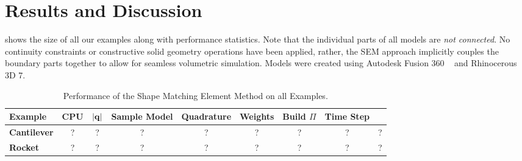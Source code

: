 %
\section{Results and Discussion}






 shows the size of all our examples along with performance statistics. 
Note that the individual parts of all models are \emph{not connected}.
No continuity constraints or constructive solid geometry operations have been applied, rather, the SEM approach implicitly couples the boundary parts together
to allow for seamless volumetric simulation. 
Models were created using Autodesk Fusion 360 ~ and Rhinocerous 3D 7.

\begin{table*}[h]
  \caption{Performance of the Shape Matching Element Method on all Examples.}
  \label{tbl:perf}
  \begin{center}
  \begin{tabular}{l c c c c c c c c}
   \textbf{Example} & \textbf{CPU} & $|\mathbf{q}|$ &  \textbf{Sample Model} & \textbf{Quadrature} & \textbf{Weights} & \textbf{Build $\Pi$} & \textbf{Time Step} \\
   \hline 
   \rowcolor[HTML]{DAE8FC} 
   \textbf{Cantilever}  & ? & ? & ? & ? & ? & ? & ? & ? \\
   \textbf{Rocket}      & ? & ? & ? & ? & ? & ? & ? & ? \\
   \hline
  \end{tabular}
  \end{center}
  
  \end{table*}

